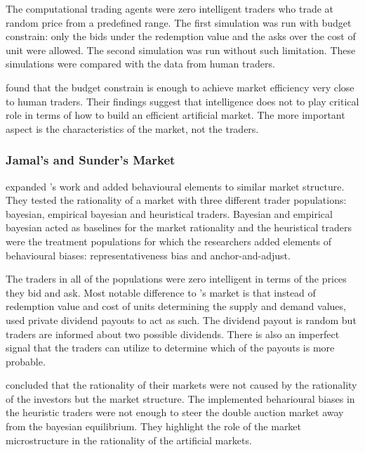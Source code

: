 The computational trading agents were zero intelligent traders 
who trade at random price from a predefined range. 
The first simulation was run with budget constrain: only the bids
under the redemption value and the asks over the cost of unit 
were allowed. The second simulation was run without such limitation.
These simulations were compared with the data from human traders.

\citeauthor{God93} found that the budget constrain is enough to 
achieve market efficiency very close to human traders. Their findings
suggest that intelligence does not to play critical role in terms of 
how to build an efficient artificial market. The more important aspect
is the characteristics of the market, not the traders.

\subsubsection{Jamal's and Sunder's Market}
\citet{Jam96} expanded \citeauthor{God93}'s work and added behavioural 
elements to similar market structure. They tested the rationality of
a market with three different trader populations: bayesian, empirical
bayesian and heuristical traders. Bayesian and empirical bayesian acted
as baselines for the market rationality and the heuristical traders were
the treatment populations for which the researchers added elements of behavioural
biases: representativeness bias and anchor-and-adjust. 

The traders in all of the populations were zero intelligent in terms of the
prices they bid and ask. Most notable difference to \citet{God93}'s market
is that instead of redemption value and cost of units determining the
supply and demand values, \citeauthor{Jam96} used private dividend payouts 
to act as such. The dividend payout is random but traders are informed
about two possible dividends. There is also an imperfect signal that the
traders can utilize to determine which of the payouts is more probable. 

\citeauthor{Jam96} concluded that the rationality of their markets were
not caused by the rationality of the investors but the market structure.
The implemented beharioural biases in the heuristic traders were not enough 
to steer the double auction market away from the bayesian equilibrium.
They highlight the role of the market microstructure in the rationality 
of the artificial markets. 



